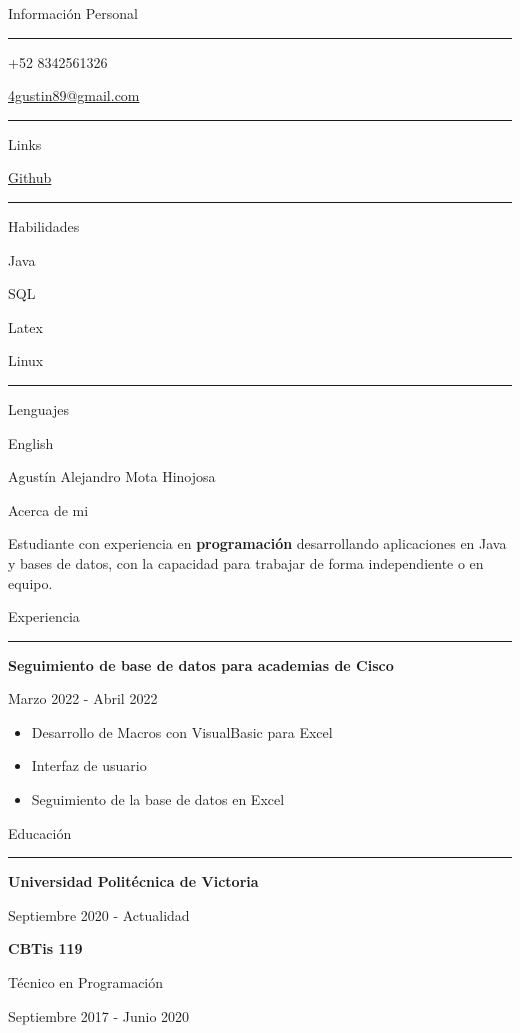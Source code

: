 \documentclass{letter}
\begin{document}
\begin{minipage}[t]{0.40\textwidth}
\setlength{\baselineskip}{1.5\baselineskip}
\color{white}
\vspace{1cm}
{\large Información Personal}

\rule{\linewidth}{0.4pt}

\faPhone \quad +52 8342561326

\faEnvelope \quad \href{somelink.com}{4gustin89@gmail.com}


\rule{\linewidth}{0.4pt}

{\large Links}


\faGithub \quad \href{https://github.com/Augustus-Tercero}{Github}

\rule{\linewidth}{0.4pt}

{\large Habilidades}

\faCircleNotch \quad Java

\faCircleNotch \quad SQL

\faCircleNotch \quad Latex

\faCircleNotch \quad Linux


\rule{\linewidth}{0.4pt}

{\large Lenguajes}

\faLanguage \quad English

\end{minipage}
\hfill
\begin{minipage}[t]{0.60\textwidth}
\setlength{\baselineskip}{1.5\baselineskip}
\vspace{0.8cm}
{\huge Agustín Alejandro Mota Hinojosa}

{\large Acerca de mi}

\vspace{0.5cm}

Estudiante con experiencia en \textbf{programación} desarrollando aplicaciones en Java y bases de datos, con la capacidad para trabajar de forma independiente o en equipo.

\vspace{0.5cm}

{\large Experiencia}
\rule{\linewidth}{0.4pt}

{\large \textbf{Seguimiento de base de datos para academias de Cisco}}

{\small Marzo 2022 - Abril 2022}

\begin{itemize}
    \item Desarrollo de Macros con VisualBasic para Excel
    \item Interfaz de usuario
    \item Seguimiento de la base de datos en Excel
\end{itemize}

{\large Educación}
\rule{\linewidth}{0.4pt}

{\large \textbf{Universidad Politécnica de Victoria}}

{\small Septiembre 2020 - Actualidad}

{\large \textbf{CBTis 119}}

Técnico en Programación

{\small Septiembre 2017 - Junio 2020}

\end{minipage}
\end{document}
